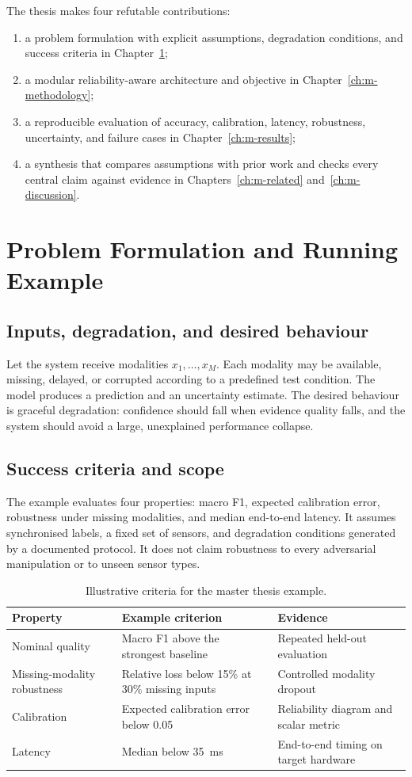 The thesis makes four refutable contributions:
\begin{enumerate}
  \item a problem formulation with explicit assumptions, degradation conditions, and success criteria in Chapter~\ref{ch:m-problem};
  \item a modular reliability-aware architecture and objective in Chapter~\ref{ch:m-methodology};
  \item a reproducible evaluation of accuracy, calibration, latency, robustness, uncertainty, and failure cases in Chapter~\ref{ch:m-results};
  \item a synthesis that compares assumptions with prior work and checks every central claim against evidence in Chapters~\ref{ch:m-related} and~\ref{ch:m-discussion}.
\end{enumerate}

\chapter{Problem Formulation and Running Example}\label{ch:m-problem}
\section{Inputs, degradation, and desired behaviour}
Let the system receive modalities $x_1,\ldots,x_M$. Each modality may be available, missing, delayed, or corrupted according to a predefined test condition. The model produces a prediction and an uncertainty estimate. The desired behaviour is graceful degradation: confidence should fall when evidence quality falls, and the system should avoid a large, unexplained performance collapse.

\section{Success criteria and scope}
The example evaluates four properties: macro F1, expected calibration error, robustness under missing modalities, and median end-to-end latency. It assumes synchronised labels, a fixed set of sensors, and degradation conditions generated by a documented protocol. It does not claim robustness to every adversarial manipulation or to unseen sensor types.

\begin{table}[htbp]
\centering
\caption{Illustrative criteria for the master thesis example.}
\label{tab:m-criteria}
\begin{tabularx}{\textwidth}{YYY}
\toprule
Property & Example criterion & Evidence\\
\midrule
Nominal quality & Macro F1 above the strongest baseline & Repeated held-out evaluation\\
Missing-modality robustness & Relative loss below 15\% at 30\% missing inputs & Controlled modality dropout\\
Calibration & Expected calibration error below 0.05 & Reliability diagram and scalar metric\\
Latency & Median below 35~ms & End-to-end timing on target hardware\\
\bottomrule
\end{tabularx}
\end{table}

